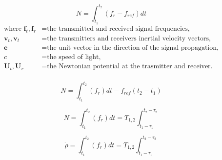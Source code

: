 \begin{equation}
    N = \int_{t_1}^{t_2}(f_r-f_{ref})dt
\end{equation}
\begin{equation*}
    \begin{aligned}
        \textrm{where  }
        \mathbf{f}_t, \mathbf{f}_r &= \textrm{the transmitted and received signal frequencies,}\\
        \mathbf{v}_t, \mathbf{v}_t &= \textrm{the transmitters and receivers inertial velocity vectors,}\\
        \mathbf{e} &= \textrm{the unit vector in the direction of the signal propagation,}\\
        c &= \textrm{the speed of light,}\\
        \mathbf{U}_t, \mathbf{U}_r &= \textrm{the Newtonian potential at the trasmitter and receiver.}\\
    \end{aligned}
\end{equation*}

\begin{equation}
    N = \int_{t_1}^{t_2}(f_r)dt-f_{ref}(t_2-t_1)
\end{equation}

\begin{equation}
    N = \int_{t_1}^{t_2}(f_r)dt = T_{1,2}\int_{t_1-\tau_1}^{t_2-\tau_2}
\end{equation}

\begin{equation}
    \dot{\rho} = \int_{t_1}^{t_2}(f_r)dt = T_{1,2}\int_{t_1-\tau_1}^{t_2-\tau_2}
\end{equation}





